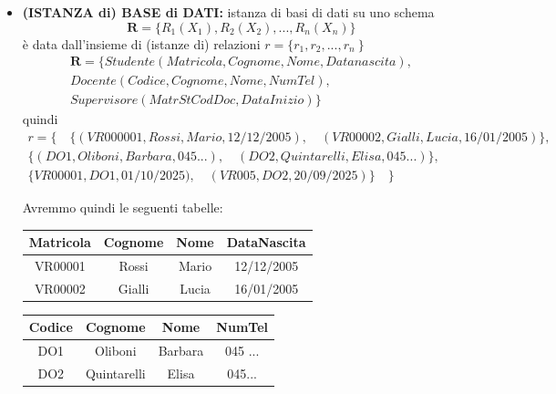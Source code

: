 \documentclass{article}
\newcounter{esempio}
\newenvironment{esempio}{
	\refstepcounter{esempio}%
	\noindent\textbf{Esempio \theesempio:}
}{\par}
\begin{document}
\begin{itemize}
    \begin{esempio}
    	Esempio: dato lo schema di relazione Studente(Matricola, Cognome, Nome, DataNascita), l'istanza potrebbe essere \begin{align*}
    		r = \{(VR000001, Rossi, Mario, 12/04/2005), \\(VR000002, Gialli, Lucia, 27/0/2004),\\ (VR000003, Verdi, Luca, 21/08/2006)\}
    	\end{align*}
    \end{esempio}
    \item \textbf{(ISTANZA di) BASE di DATI:} istanza di basi di dati su uno schema \begin{equation*}
        \boldsymbol{R}= \{  R_1(X_1), R_2(X_2), ..., R_n(X_n) \}
    \end{equation*} è data dall'insieme di (istanze di) relazioni $r = 
\{ r_1, r_2, ..., r_n\ \}$
 \begin{align*}
        \boldsymbol{R} = \{ Studente(Matricola, Cognome, Nome, Datanascita), \\ Docente(Codice, Cognome, Nome, NumTel), \\ Supervisore(MatrSt CodDoc, DataInizio)\}
    \end{align*}
    quindi
    \begin{align*}
        r = \{ \quad \{(VR000001, Rossi, Mario, 12/12/2005), \quad (VR00002, Gialli, Lucia, 16/01/2005)\},\quad \\ \{(DO1, Oliboni, Barbara, 045 ...), \quad (DO2, Quintarelli, Elisa, 045 ...)\},\quad \\ \{VR00001, DO1, 01/10/2025), \quad (VR005, DO2, 20/09/2025)\} \quad \}
    \end{align*}
    
    Avremmo quindi le seguenti tabelle:
    
\noindent
\begin{minipage}{.4\textwidth}
  \centering
    \begin{tabular}{|c|c|c|c|}
        \hline
        \textbf{Matricola} & \textbf{Cognome} & \textbf{Nome} & \textbf{DataNascita}\\
        \hline
         VR00001 & Rossi & Mario & 12/12/2005 \\
         \hline
         VR00002 & Gialli & Lucia & 16/01/2005 \\
         \hline
        \end{tabular}
\end{minipage}%
\hfill
\begin{minipage}{.4\textwidth}
  \centering
       \begin{tabular}{|c|c|c|c|}
        \hline
          \textbf{Codice} & \textbf{Cognome} & \textbf{Nome} & \textbf{NumTel} \\
          \hline
          DO1 & Oliboni & Barbara & 045 ... \\
          \hline
          DO2 & Quintarelli & Elisa & 045... \\
          \hline
        \end{tabular}
\hspace{1em}
\end{minipage}


\end{itemize}
\end{document}

